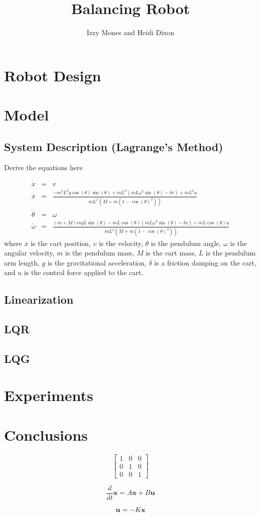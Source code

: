 \documentclass[]{article}
\title{Balancing Robot}
\author{Izzy Mones and Heidi Dixon}
\newcommand{\bx}{\boldsymbol{x}}
\newcommand{\bu}{\boldsymbol{u}}
\begin{document}
	\maketitle

\section*{Robot Design}


\section*{Model}
\subsection*{System Description (Lagrange's Method)}
Derive the equations here

\begin{eqnarray}
	\dot{x} & = & v \\
	\ddot{x}          & = & \frac{-m^2L^2g \cos(\theta)\sin(\theta) + mL^2(mL\omega^2 \sin(\theta)-\delta v)+mL^2u }{mL^2(M+m(1-\cos(\theta)^2))} \\
	\dot{\theta}  &= & \omega \\
	\dot{\omega}  &= & \frac{(m+M)mgL\sin(\theta)-mL\cos(\theta)(mL\omega^2\sin(\theta)-\delta v)+mL\cos(\theta)u}{mL^2(M+m(1-\cos(\theta)^2))}
\end{eqnarray}
where $x$ is the cart position, $v$ is the velocity, $\theta$ is the pendulum angle, $\omega$ is the angular velocity, $m$ is the pendulum mass, $M$ is the cart mass, $L$ is the pendulum arm length, $g$ is the gravitational acceleration, $\delta$ is a friction damping on the cart, and $u$ is the control force applied to the cart.


\subsection*{Linearization}

\subsection*{LQR}
\subsection*{LQG}
\section*{Experiments}

\section*{Conclusions}
	
	\begin{equation}
	\begin{bmatrix}
		1 & 0 & 0 \\
		0 & 1 & 0 \\
		0 & 0 & 1
	\end{bmatrix}
	\end{equation}

\begin{equation}
	\frac{d}{dt} \bx = A \bx + B \bu
\end{equation}

\begin{equation}
	\bu = -K \bx
\end{equation}

	


	
\end{document}
